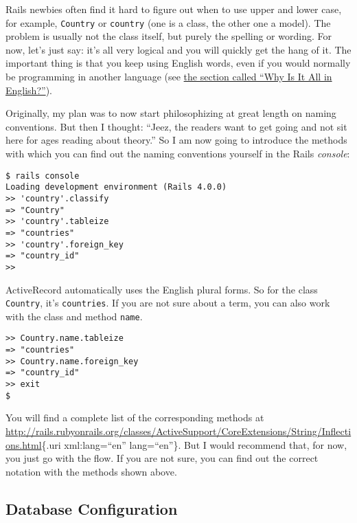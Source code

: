 \documentclass[a4paper]{book}
\newcounter{tab}[chapter]
\begin{document}
Rails newbies often find it hard to figure out when to use upper and lower case, for example, \texttt{Country} or \texttt{country} (one is a class, the other one a model). The problem is usually not the class itself, but purely the spelling or wording. For now, let's just say: it's all very logical and you will quickly get the hang of it. The important thing is that you keep using English words, even if you would normally be programming in another language (see \hyperref[warumux5fenglish]{the section called “Why Is It All in English?”}).

Originally, my plan was to now start philosophizing at great length on naming conventions. But then I thought: “Jeez, the readers want to get going and not sit here for ages reading about theory.” So I am now going to introduce the methods with which you can find out the naming conventions yourself in the Rails \emph{console}:

\begin{shaded}\begin{verbatim}
$ rails console
Loading development environment (Rails 4.0.0)
>> 'country'.classify
=> "Country"
>> 'country'.tableize
=> "countries"
>> 'country'.foreign_key
=> "country_id"
>>
\end{verbatim}\end{shaded}

ActiveRecord automatically uses the English plural forms. So for the class \texttt{Country}, it's \texttt{countries}. If you are not sure about a term, you can also work with the class and method \texttt{name}.

\begin{shaded}\begin{verbatim}
>> Country.name.tableize
=> "countries"
>> Country.name.foreign_key
=> "country_id"
>> exit
$
\end{verbatim}\end{shaded}

You will find a complete list of the corresponding methods at \url{http://rails.rubyonrails.org/classes/ActiveSupport/CoreExtensions/String/Inflections.html}\{.uri xml:lang=“en” lang=“en”\}. But I would recommend that, for now, you just go with the flow. If you are not sure, you can find out the correct notation with the methods shown above.

\subsection{Database Configuration}\label{database-configuration}
\end{document}
